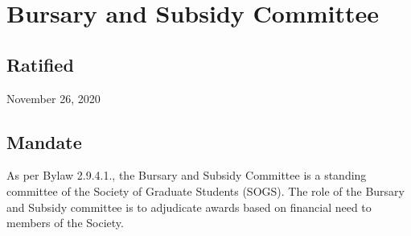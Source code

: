 \section{Bursary and Subsidy Committee}

\subsection{Ratified}
November 26, 2020

\subsection{Mandate}
As per Bylaw 2.9.4.1., the Bursary and Subsidy Committee is a standing committee of the Society of Graduate Students (SOGS). The role of the Bursary and Subsidy committee is to adjudicate awards based on financial need to members of the Society.


